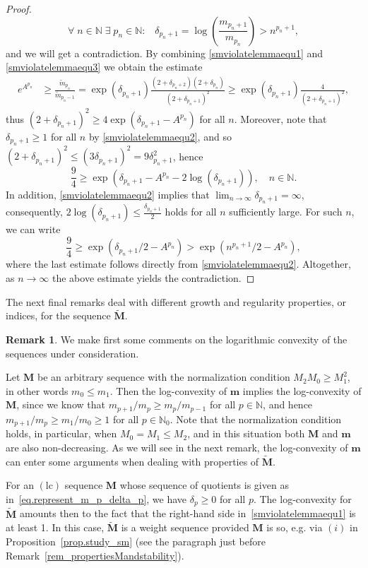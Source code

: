 \documentclass[12pt,a4paper]{article}
\newcommand{\N}{\mathbb{N}}
\newcommand{\M}{{\boldsymbol{M}}}
\newcommand{\m}{{\boldsymbol{m}}}
\newcommand{\lc}{\operatorname{(lc)}}
\theoremstyle{plain}
\theoremstyle{definition}
\newtheorem{remark}[theorem]{Remark}
\numberwithin{equation}{section}
\begin{document}
\begin{proof}
\begin{equation}
\forall\;n\in\mathbb{N}\;\exists\;p_n\in\mathbb{N}:\;\;\; \delta_{p_n+1}=\log\left(\frac{m_{p_n+1}}{m_{p_n}}\right)>n^{p_n+1},
\end{equation}
and we will get a contradiction. By combining \eqref{smviolatelemmaequ1} and \eqref{smviolatelemmaequ3} we obtain the estimate
\begin{align*}
e^{A^{p_n}}&\ge\frac{\widetilde{m}_{p_n}}{\widetilde{m}_{p_n-1}}=\exp(\delta_{p_n+1})\frac{(2+\delta_{p_n+2})(2+\delta_{p_n})}{(2+\delta_{p_n+1})^2}
\ge\exp(\delta_{p_n+1})\frac{4}{(2+\delta_{p_n+1})^2},
\end{align*}
thus $(2+\delta_{p_n+1})^2\ge 4\exp\left(\delta_{p_n+1}-A^{p_n}\right)$ for all $n$. Moreover, note that $\delta_{p_n+1}\ge 1$ for all $n$ by \eqref{smviolatelemmaequ2}, and so $(2+\delta_{p_n+1})^2\le(3\delta_{p_n+1})^2=9\delta_{p_n+1}^2$, hence $$
\frac{9}{4}\ge \exp\left(\delta_{p_n+1}-A^{p_n}-2\log(\delta_{p_n+1})\right),\quad n\in\N.
$$
In addition, \eqref{smviolatelemmaequ2} implies that $\lim_{n\rightarrow\infty}\delta_{p_n+1}=\infty$, consequently, $2\log(\delta_{p_n+1})\le\frac{\delta_{p_n+1}}{2}$ holds for all $n$ sufficiently large. For such $n$, we can write
\begin{equation*}
\frac{9}{4}\ge
\exp\left(\delta_{p_n+1}/2-A^{p_n}\right)>
\exp\left(n^{p_n+1}/2-A^{p_n}\right),
\end{equation*}
where the last estimate follows directly from \eqref{smviolatelemmaequ2}.
Altogether, as $n\rightarrow\infty$ the above estimate yields the  contradiction.
\end{proof}

The next final remarks deal with different growth and regularity properties, or indices, for the sequence $\widetilde{\M}$.

\begin{remark}\label{rem.log_conv_m_p}
We make first some comments on the logarithmic convexity of the sequences under consideration.

Let $\M$ be an arbitrary sequence with the normalization
condition $M_2M_0\ge M_1^2$, in other words $m_0\le m_1$. Then the log-convexity of $\m$
implies the log-convexity of $\M$, since we know that $m_{p+1}/m_p\ge m_p/m_{p-1}$ for all
$p\in\mathbb{N}$, and hence $m_{p+1}/m_p\ge m_1/m_0\ge 1$ for all $p\in\mathbb{N}_0$.
Note that the normalization condition holds, in particular, when $M_0=M_1\le M_2$, and in this situation both $\M$ and $\m$ are also non-decreasing. As we will see in the next remark, the log-convexity of $\m$ can enter some arguments when dealing with properties of $\widetilde{\M}$.  

For an $\lc$ sequence $\M$ whose sequence of quotients is given as in~\eqref{eq.represent_m_p_delta_p}, we have $\delta_p\ge 0$ for all $p$. The log-convexity for $\widetilde{\M}$ amounts then to the fact that the right-hand side in~\eqref{smviolatelemmaequ1} is at least 1. In this case, $\widetilde{\M}$ is a weight sequence provided $\M$ is so,
e.g. via $(i)$ in Proposition~\ref{prop.study_sm} (see the paragraph just before Remark~\ref{rem_propertiesMandstability}).
\end{remark}
\end{document}
